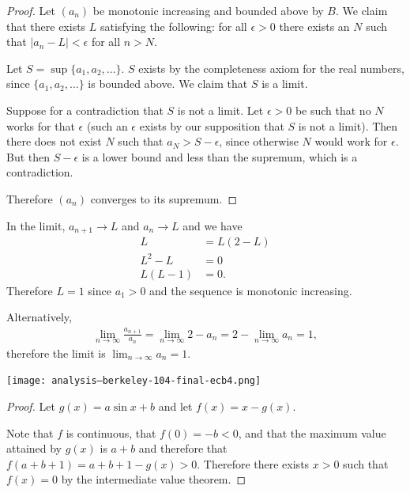 \begin{proof}
  Let $(a_n)$ be monotonic increasing and bounded above by $B$. We claim that there exists $L$ satisfying the
  following: for all $\epsilon > 0$ there exists an $N$ such that $|a_n - L| < \epsilon$ for all $n > N$.

  Let $S = \sup \{a_1, a_2, \ldots\}$. $S$ exists by the completeness axiom for the real numbers,
  since $\{a_1, a_2, \ldots\}$ is bounded above. We claim that $S$ is a limit.

  Suppose for a contradiction that $S$ is not a limit. Let $\epsilon > 0$ be such that no $N$ works for
  that $\epsilon$ (such an $\epsilon$ exists by our supposition that $S$ is not a limit). Then there does not
  exist $N$ such that $a_N > S - \epsilon$, since otherwise $N$ would work for $\epsilon$. But
  then $S - \epsilon$ is a lower bound and less than the supremum, which is a contradiction.

  Therefore $(a_n)$ converges to its supremum.
\end{proof}

In the limit, $a_{n+1} \to L$ and $a_n \to L$ and we have
\begin{align*}
  L &= L(2 - L) \\
  L^2 - L &= 0 \\
  L(L - 1) &= 0.
\end{align*}
Therefore $L = 1$ since $a_1 > 0$ and the sequence is monotonic increasing.

Alternatively,
\begin{align*}
  \lim_{n\to\infty} \frac{a_{n+1}}{a_n} = \lim_{n\to\infty} 2 - a_n = 2 - \lim_{n\to\infty} a_n = 1,
\end{align*}
therefore the limit is $\lim_{n\to\infty} a_n = 1$.

\checkmark

\texttt{[image: analysis--berkeley-104-final-ecb4.png]}
\begin{proof}
  Let $g(x) = a\sin x + b$ and let $f(x) = x - g(x)$.

  Note that $f$ is continuous, that $f(0) = -b < 0$, and that the maximum value attained by $g(x)$ is $a + b$ and
  therefore that $f(a + b + 1) = a + b + 1 - g(x) > 0$. Therefore there exists $x > 0$ such that $f(x) = 0$ by
  the intermediate value theorem.
\end{proof}

